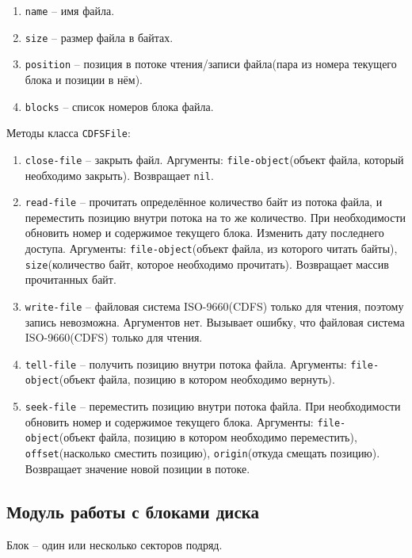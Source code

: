\begin{enumerate}
	\begin{enumerate}
	\item \texttt{name} -- имя файла.
	\item \texttt{size} -- размер файла в байтах.
	\item \texttt{position} -- позиция в потоке чтения/записи файла(пара из номера текущего блока и позиции в нём).
	\item \texttt{blocks} -- список номеров блока файла.
	\end{enumerate}

Методы класса \texttt{CDFSFile}:

	\begin{enumerate}
	\item \texttt{close-file} -- закрыть файл. Аргументы: \texttt{file-object}(объект файла, который необходимо закрыть). Возвращает \texttt{nil}.
	\item \texttt{read-file} -- прочитать определённое количество байт из потока файла, и переместить позицию внутри потока на то же количество. При необходимости обновить номер и содержимое текущего блока. Изменить дату последнего доступа. Аргументы: \texttt{file-object}(объект файла, из которого читать байты), \texttt{size}(количество байт, которое необходимо прочитать). Возвращает массив прочитанных байт.
	\item \texttt{write-file} -- файловая система ISO-9660(CDFS) только для чтения, поэтому запись невозможна. Аргументов нет. Вызывает ошибку, что файловая система ISO-9660(CDFS) только для чтения.
	\item \texttt{tell-file} -- получить позицию внутри потока файла. Аргументы: \texttt{file-object}(объект файла, позицию в котором необходимо вернуть).
	\item \texttt{seek-file} -- переместить позицию внутри потока файла. При необходимости обновить номер и содержимое текущего блока. Аргументы: \texttt{file-object}(объект файла, позицию в котором необходимо переместить), \texttt{offset}(насколько сместить позицию), \texttt{origin}(откуда смещать позицию). Возвращает значение новой позиции в потоке.
	\end{enumerate}

\end{enumerate}

\subsection{Модуль работы с блоками диска}

Блок -- один или несколько секторов подряд.

